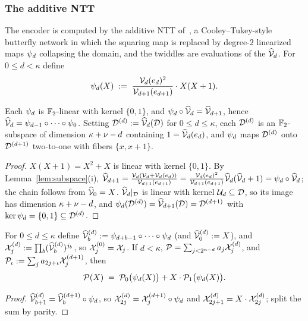 \subsubsection{The additive NTT}\label{sec:ntt}

The encoder is computed by the additive NTT of~\cite{LCH14}, a Cooley--Tukey-style butterfly network in which the squaring map is replaced by degree-$2$ linearized maps $\psi_d$ collapsing the domain, and the twiddles are evaluations of the $\widehat{\mathcal{V}}_{d}$. For $0 \le d < \kappa$ define
\[
\psi_d(X) \;:=\; \frac{\mathcal{V}_d(e_d)^2}{\mathcal{V}_{d+1}(e_{d+1})} \cdot X(X+1).
\]

\begin{lemma}\label{lem:chain}
Each $\psi_d$ is $\mathbb{F}_2$-linear with kernel $\{0,1\}$, and $\psi_d \circ \widehat{\mathcal{V}}_{d} = \widehat{\mathcal{V}}_{d+1}$, hence $\widehat{\mathcal{V}}_{d} = \psi_{d-1} \circ \dots \circ \psi_0$. Setting $\mathcal{D}^{(d)} := \widehat{\mathcal{V}}_{d}(\mathcal{D})$ for $0 \le d \le \kappa$, each $\mathcal{D}^{(d)}$ is an $\mathbb{F}_2$-subspace of dimension $\kappa + \nu - d$ containing $1 = \widehat{\mathcal{V}}_{d}(e_d)$, and $\psi_d$ maps $\mathcal{D}^{(d)}$ onto $\mathcal{D}^{(d+1)}$ two-to-one with fibers $\{x, x+1\}$.
\end{lemma}

\begin{proof}
$X(X+1) = X^2 + X$ is linear with kernel $\{0,1\}$. By Lemma~\ref{lem:subspace}(i), $\widehat{\mathcal{V}}_{d+1} = \tfrac{\mathcal{V}_d (\mathcal{V}_d + \mathcal{V}_d(e_d))}{\mathcal{V}_{d+1}(e_{d+1})} = \tfrac{\mathcal{V}_d(e_d)^2}{\mathcal{V}_{d+1}(e_{d+1})} \widehat{\mathcal{V}}_{d}(\widehat{\mathcal{V}}_{d} + 1) = \psi_d \circ \widehat{\mathcal{V}}_{d}$; the chain follows from $\widehat{\mathcal{V}}_{0} = X$. $\widehat{\mathcal{V}}_{d}|_{\mathcal{D}}$ is linear with kernel $\mathcal{U}_d \subseteq \mathcal{D}$, so its image has dimension $\kappa + \nu - d$, and $\psi_d(\mathcal{D}^{(d)}) = \widehat{\mathcal{V}}_{d+1}(\mathcal{D}) = \mathcal{D}^{(d+1)}$ with $\ker \psi_d = \{0,1\} \subseteq \mathcal{D}^{(d)}$.
\end{proof}

\begin{lemma}\label{lem:evenodd}
For $0 \le d \le \kappa$ define $\widehat{\mathcal{V}}_{b}^{(d)} := \psi_{d+b-1} \circ \dots \circ \psi_d$ (and $\widehat{\mathcal{V}}_{0}^{(d)} := X$), and $\mathcal{X}^{(d)}_j := \prod_b (\widehat{\mathcal{V}}_{b}^{(d)})^{j_b}$, so $\mathcal{X}^{(0)}_j = \mathcal{X}_j$. If $d < \kappa$, $\mathcal{P} = \sum_{j < 2^{\kappa-d}} a_j \mathcal{X}^{(d)}_j$, and $\mathcal{P}_\iota := \sum_j a_{2j+\iota} \mathcal{X}^{(d+1)}_j$, then
\[
\mathcal{P}(X) \;=\; \mathcal{P}_0\bigl(\psi_d(X)\bigr) + X \cdot \mathcal{P}_1\bigl(\psi_d(X)\bigr).
\]
\end{lemma}

\begin{proof}
$\widehat{\mathcal{V}}_{b+1}^{(d)} = \widehat{\mathcal{V}}_{b}^{(d+1)} \circ \psi_d$, so $\mathcal{X}^{(d)}_{2j} = \mathcal{X}^{(d+1)}_j \circ \psi_d$ and $\mathcal{X}^{(d)}_{2j+1} = X \cdot \mathcal{X}^{(d)}_{2j}$; split the sum by parity.
\end{proof}

